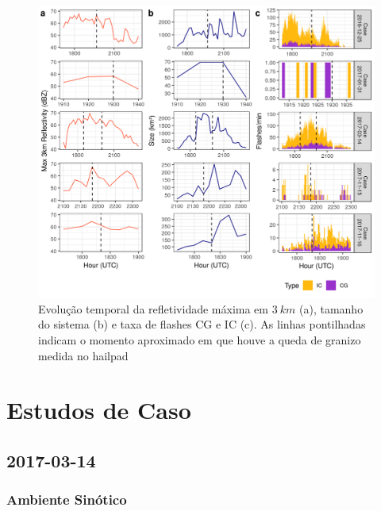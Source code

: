 \begin{figure}[htb]
	\begin{center}
		\caption{Evolução temporal da refletividade máxima em $3\:km$ (a), tamanho do sistema (b) e taxa de flashes CG e IC (c). As linhas pontilhadas indicam o momento aproximado em que houve a queda de granizo medida no hailpad} 
		\label{painel_ciclo}
		\includegraphics[width=\columnwidth]{../General_Processing/figures/cases_dbz_size_lightning.png}
	\end{center}
\end{figure}



\section{Estudos de Caso}\label{estudo_casos}

\subsection{2017-03-14}

\subsubsection{Ambiente Sinótico}\label{sinotica_201703014}

